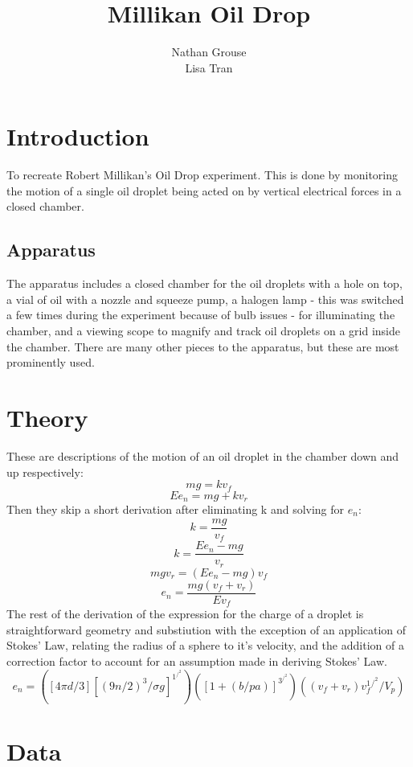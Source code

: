 \documentclass[12pt]{article}
\title{Millikan Oil Drop}
\author{Nathan Grouse\\Lisa Tran}
\begin{document}
\maketitle

\section{Introduction}
\indent \indent To recreate Robert Millikan's Oil Drop experiment. This is done by monitoring the motion of a single oil droplet being acted on by vertical electrical forces in a closed chamber.

\subsection{Apparatus}
\indent \indent The apparatus includes a closed chamber for the oil droplets with a hole on top, a vial of oil with a nozzle and squeeze pump, a halogen lamp - this was switched a few times during the experiment because of bulb issues - for illuminating the chamber, and a viewing scope to magnify and track oil droplets on a grid inside the chamber. There are many other pieces to the apparatus, but these are most prominently used.

\section{Theory}
\indent \indent These are descriptions of the motion of an oil droplet in the chamber down and up respectively:
\[ mg = kv_f \]
\[ Ee_n = mg + kv_r \]
\indent \indent Then they skip a short derivation after eliminating k and solving for $e_n$:
\[k = \frac{mg}{v_f} \]
\[k = \frac{Ee_n - mg}{v_r} \]
\[mgv_r = (Ee_n - mg)v_f \]
\[e_n = \frac{mg(v_f + v_r)}{Ev_f} \]
\indent \indent The rest of the derivation of the expression for the charge of a droplet is straightforward geometry and substiution with the exception of an application of Stokes' Law, relating the radius of a sphere to it's velocity, and the addition of a correction factor to account for an assumption made in deriving Stokes' Law.
\[e_n = ([4 \pi d/3][(9n/2)^3/\sigma g]^1^/^2)([1+(b/pa)]^3^/^2)((v_f + v_r)v_f^1^/^2 / V_p) \]

\section{Data}
\end{document}
